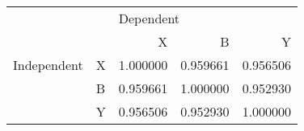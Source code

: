 \begin{tabular}{llrrr}
\toprule
            &   & \multicolumn{3}{l}{Dependent} \\
            &   &         X &         B &         Y \\
\midrule
Independent & X &  1.000000 &  0.959661 &  0.956506 \\
            & B &  0.959661 &  1.000000 &  0.952930 \\
            & Y &  0.956506 &  0.952930 &  1.000000 \\
\bottomrule
\end{tabular}

